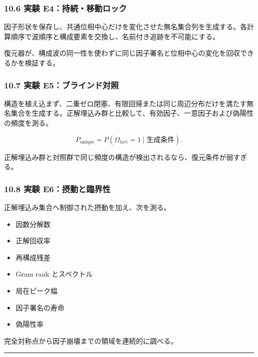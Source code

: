 \documentclass[
  a4paper,
]{ltjsarticle}
\providecommand{\tightlist}{%
  \setlength{\itemsep}{0pt}\setlength{\parskip}{0pt}}
\begin{document}
\subsubsection{10.6 実験
E4：持続・移動ロック}\label{ux5b9fux9a13-e4ux6301ux7d9aux79fbux52d5ux30edux30c3ux30af}

因子形状を保存し、共通位相中心だけを変化させた無名集合列を生成する。各計算順序で波順序と構成要素を交換し、名前付き追跡を不可能にする。

復元器が、構成波の同一性を使わずに同じ因子署名と位相中心の変化を回収できるかを検証する。

\subsubsection{10.7 実験
E5：ブラインド対照}\label{ux5b9fux9a13-e5ux30d6ux30e9ux30a4ux30f3ux30c9ux5bfeux7167}

構造を植え込まず、二乗ゼロ閉塞、有限回帰または同じ周辺分布だけを満たす無名集合を生成する。正解埋込み群と比較して、有効因子、一意因子および偽陽性の頻度を測る。

\[
P_{\mathrm{unique}}
=
P\left(
\Omega_{\mathrm{fact}}=1
\mid
\text{生成条件}
\right).
\]

正解埋込み群と対照群で同じ頻度の構造が検出されるなら、復元条件が弱すぎる。

\subsubsection{10.8 実験
E6：摂動と臨界性}\label{ux5b9fux9a13-e6ux6442ux52d5ux3068ux81e8ux754cux6027}

正解埋込み集合へ制御された摂動を加え、次を測る。

\begin{itemize}
\tightlist
\item
  因数分解数
\item
  正解回収率
\item
  再構成残差
\item
  Gram rank とスペクトル
\item
  局在ピーク幅
\item
  因子署名の寿命
\item
  偽陽性率
\end{itemize}

完全対称点から因子崩壊までの領域を連続的に調べる。

\begin{center}\rule{0.5\linewidth}{0.5pt}\end{center}
\end{document}
